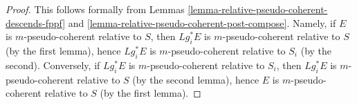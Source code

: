\documentclass[10pt,a4paper]{amsart}
\theoremstyle{plain}
\theoremstyle{definition}
\theoremstyle{remark}
\numberwithin{equation}{subsection}
\begin{document}
\begin{proof}
This follows formally from
Lemmas \ref{lemma-relative-pseudo-coherent-descends-fppf} and
\ref{lemma-relative-pseudo-coherent-post-compose}.
Namely, if $E$ is $m$-pseudo-coherent relative to $S$,
then $Lg_i^*E$ is $m$-pseudo-coherent relative to $S$ (by the first lemma),
hence $Lg_i^*E$ is $m$-pseudo-coherent relative to $S_i$ (by the second).
Conversely, if
$Lg_i^*E$ is $m$-pseudo-coherent relative to $S_i$, then
$Lg_i^*E$ is $m$-pseudo-coherent relative to $S$ (by the second lemma),
hence $E$ is $m$-pseudo-coherent relative to $S$ (by the first lemma).
\end{proof}
\end{document}
